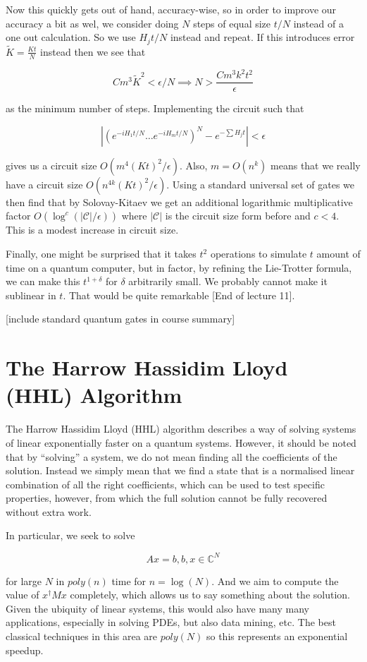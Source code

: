\documentclass{article}
\theoremstyle{definition}
\begin{document}
Now this quickly gets out of hand, accuracy-wise, so in order to improve our
accuracy a bit as wel, we consider doing $N$ steps of equal size $t/N$ instead
of a one out calculation. So we use $H_j t / N$ instead and repeat. If this
introduces error $\tilde{K} = \frac{Kt}{N}$ instead then we see that

$$ Cm^3 \tilde{K}^2 < \epsilon / N \implies N > \frac{C m^3 k^2
  t^2}{\epsilon} $$

as the minimum number of steps. Implementing the circuit such that

$$ \left| \left( e^{-iH_1 t / N} \dots e^{-iH_m t / N} \right)^N - e^{-\sum H_j
    t} \right| < \epsilon $$

gives us a circuit size $O(m^4 (Kt)^2 / \epsilon)$. Also, $m = O(n^k)$ means
that we really have a circuit size $O(n^{4k} (Kt)^2 / \epsilon)$. Using a
standard universal set of gates we then find that by Solovay-Kitaev we get an
additional logarithmic multiplicative factor $O(\log^c(|\mathcal{C}| /
\epsilon))$ where $|\mathcal{C}|$ is the circuit size form before and $c < 4$.
This is a modest increase in circuit size.

Finally, one might be surprised that it takes $t^2$ operations to simulate $t$
amount of time on a quantum computer, but in factor, by refining the Lie-Trotter
formula, we can make this $t^{1 + \delta}$ for $\delta$ arbitrarily small. We
probably cannot make it sublinear in $t$. That would be quite remarkable [End of
lecture 11]. 

[include standard quantum gates in course summary]

\section{The Harrow Hassidim Lloyd (HHL) Algorithm}

The Harrow Hassidim Lloyd (HHL) algorithm describes a way of solving systems of
linear exponentially faster on a quantum systems. However, it should be noted
that by ``solving'' a system, we do not mean finding all the coefficients of the
solution. Instead we simply mean that we find a state that is a normalised
linear combination of all the right coefficients, which can be used to test
specific properties, however, from which the full solution cannot be fully
recovered without extra work. 

In particular, we seek to solve

$$ Ax = b, b, x \in \mathbb{C}^N $$

for large $N$ in $poly(n)$ time for $n = \log(N)$. And we aim to compute the
value of $x^\dagger M x$ completely, which allows us to say something about the
solution. Given the ubiquity of linear systems, this would also have many many
applications, especially in solving PDEs, but also data mining, etc. The best
classical techniques in this area are $poly(N)$ so this represents an
exponential speedup.
\end{document}

